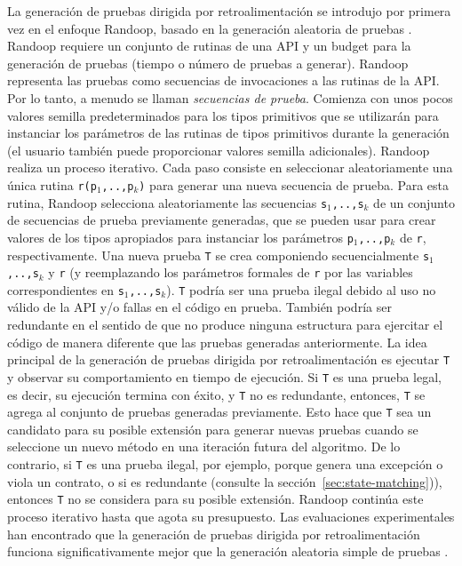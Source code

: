 La generación de pruebas dirigida por retroalimentación se introdujo por primera vez en el enfoque \textsf{Randoop}, basado en la generación aleatoria de pruebas \cite{Pacheco07}. \textsf{Randoop} requiere un conjunto de rutinas de una API y un budget para la generación de pruebas (tiempo o número de pruebas a generar). \textsf{Randoop} representa las pruebas como secuencias de invocaciones a las rutinas de la API. Por lo tanto, a menudo se llaman \emph{secuencias de prueba}. Comienza con unos pocos valores semilla predeterminados para los tipos primitivos que se utilizarán para instanciar los parámetros de las rutinas de tipos primitivos durante la generación (el usuario también puede proporcionar valores semilla adicionales). \textsf{Randoop} realiza un proceso iterativo. Cada paso consiste en seleccionar aleatoriamente una única rutina \texttt{r(p$_1$,..,p$_k$)} para generar una nueva secuencia de prueba. Para esta rutina, \textsf{Randoop} selecciona aleatoriamente las secuencias \texttt{s$_1$,..,s$_k$} de un conjunto de secuencias de prueba previamente generadas, que se pueden usar para crear valores de los tipos apropiados para instanciar los parámetros \texttt{p$_1$,..,p$_k$} de \texttt{r}, respectivamente. Una nueva prueba \texttt{T} se crea componiendo secuencialmente \texttt{s$_1$,..,s$_k$} y \texttt{r} (y reemplazando los parámetros formales de \texttt{r} por las variables correspondientes en \texttt{s$_1$,..,s$_k$}). \texttt{T} podría ser una prueba ilegal debido al uso no válido de la API y/o fallas en el código en prueba. También podría ser redundante en el sentido de que no produce ninguna estructura para ejercitar el código de manera diferente que las pruebas generadas anteriormente.
La idea principal de la generación de pruebas dirigida por retroalimentación es ejecutar \texttt{T} y observar su comportamiento en tiempo de ejecución. Si \texttt{T} es una prueba legal, es decir, su ejecución termina con éxito,
y \texttt{T} no es redundante, entonces, \texttt{T} se agrega al conjunto de pruebas generadas previamente. Esto hace que \texttt{T} sea un candidato para su posible extensión para generar nuevas pruebas cuando se seleccione un nuevo método en una iteración futura del algoritmo. De lo contrario, si \texttt{T} es una prueba ilegal, por ejemplo, porque genera una excepción o viola un contrato, o si es redundante (consulte la sección~\ref{sec:state-matching})), entonces \texttt{T} no se considera para su posible extensión. \textsf{Randoop} continúa este proceso iterativo hasta que agota su presupuesto. Las evaluaciones experimentales han encontrado que la generación de pruebas dirigida por retroalimentación funciona significativamente mejor que la generación aleatoria simple de pruebas \cite{Pacheco07,Pacheco08}.

